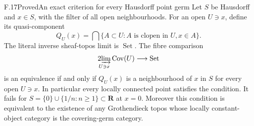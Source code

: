 \begin{statement}{F.17}{Proved}{An exact criterion for every Hausdorff point germ}
Let $S$ be Hausdorff and $x\in S$, with the filter of all open
neighbourhoods. For an open $U\ni x$, define its quasi-component
\[
 Q_U(x)=\bigcap\{A\subset U:A\text{ is clopen in }U, x\in A\}.
\]
The literal inverse sheaf-topos limit is $\operatorname{Set}$.
The fibre comparison
\[
 \operatorname*{2\!\varinjlim}_{U\ni x}\operatorname{Cov}(U)
       \longrightarrow\operatorname{Set}
\]
is an equivalence if and only if $Q_U(x)$ is a neighbourhood of
$x$ in $S$ for every open $U\ni x$. In particular every locally
connected point satisfies the condition. It fails for
$S=\{0\}\cup\{1/n:n\geq1\}\subset\mathbf R$ at $x=0$.
Moreover this condition is equivalent to the existence of any
Grothendieck topos whose locally constant-object category is the
covering-germ category.
\end{statement}
